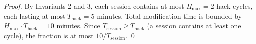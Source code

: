 \begin{proof}
By Invariants 2 and 3, each session contains at most $H_{\max} = 2$ hack cycles,
each lasting at most $T_{\text{hack}} = 5$ minutes. Total modification time is
bounded by $H_{\max} \cdot T_{\text{hack}} = 10$ minutes. Since
$T_{\text{session}} \geq T_{\text{hack}}$ (a session contains at least one
cycle), the fraction is at most $10 / T_{\text{session}}$. \qed
\end{proof}

